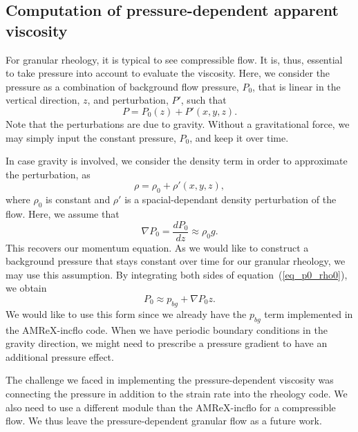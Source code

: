 \subsection{Computation of pressure-dependent apparent viscosity}
For granular rheology, it is typical to see compressible flow. It is, thus, essential to take pressure into account to evaluate the viscosity.
Here, we consider the pressure as a combination of background flow pressure, $P_0$, that is linear in the vertical direction, $z$, and perturbation, $P'$, such that
\[
P = P_0(z) + P'(x,y,z).\]
Note that the perturbations are due to gravity. Without a gravitational force, we may simply input the constant pressure, $P_0$, and keep it over time.
\par
In case gravity is involved, we consider the density term in order to approximate the perturbation, as 
\[
\rho  = \rho_0  + \rho'(x,y,z), 
\]
where $\rho_0$ is constant and $\rho'$ is a spacial-dependant density perturbation of the flow. 
Here, we assume that 
\begin{equation}
    \nabla P_0  = \frac{d P_0}{d z} \approx \rho_0  g.  
\label{eq_p0_rho0}
\end{equation}
This recovers our momentum equation. As we would like to construct a background pressure that stays constant over time for our granular rheology, we may use this assumption.
By integrating both sides of equation~(\ref{eq_p0_rho0}), we obtain
\begin{equation}
    P_0 \approx p_{bg} + \nabla P_0 z.
\end{equation}
We would like to use this form since we already have the $p_{bg}$ term implemented in the AMReX-incflo code.
%
When we have periodic boundary conditions in the gravity direction, we might need to prescribe a pressure gradient to have an additional pressure effect. 
\par
The challenge we faced in implementing the pressure-dependent viscosity was connecting the pressure in addition to the strain rate into the rheology code. 
We also need to use a different module than the AMReX-incflo for a compressible flow.
 We thus leave the pressure-dependent granular flow as a future work.
